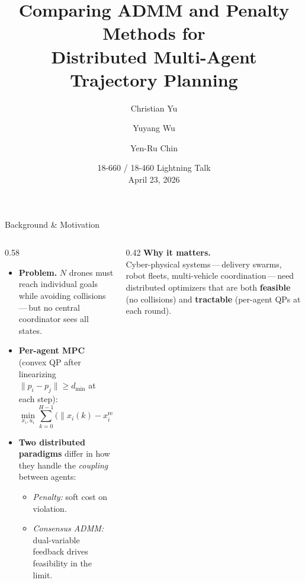 \documentclass[aspectratio=169,11pt]{beamer}
\title[ADMM vs.\ Penalty for Multi-Drone MPC]{%
  Comparing ADMM and Penalty Methods for\\
  Distributed Multi-Agent Trajectory Planning}
\author{Christian Yu \and Yuyang Wu \and Yen-Ru Chin}
\institute{Department of Electrical and Computer Engineering\\Carnegie Mellon University}
\date{18-660 / 18-460 Lightning Talk \\ April 23, 2026}
\newcommand{\dmin}{d_{\min}}
\newcommand{\good}[1]{\textcolor{green!45!black}{\textbf{#1}}}
\begin{document}
\begin{frame}
  \titlepage
\end{frame}

\begin{frame}{Background \& Motivation}
  \begin{columns}[T,onlytextwidth]
    \begin{column}{0.58\textwidth}
      \begin{itemize}
        \item \textbf{Problem.} $N$ drones must reach individual goals
              while avoiding collisions\,---\,but no central coordinator
              sees all states.
        \item \textbf{Per-agent MPC} (convex QP after linearizing
              $\|p_i - p_j\| \ge \dmin$ at each step):
              \[
                \min_{x_i,u_i}\!\!\sum_{k=0}^{H-1}\!
                \bigl(\|x_i(k)\!-\!x_i^{\text{ref}}(k)\|_Q^2
                     +\|u_i(k)\|_R^2\bigr)
              \]
        \item \textbf{Two distributed paradigms} differ in how they
              handle the \emph{coupling} between agents:
              \begin{itemize}
                \item \emph{Penalty:} soft cost on violation.
                \item \emph{Consensus ADMM:} dual-variable feedback
                      drives feasibility in the limit.
              \end{itemize}
      \end{itemize}
    \end{column}
    \begin{column}{0.42\textwidth}
      \small
      \textbf{Why it matters.}\\[0.3em]
      Cyber-physical systems\,---\,delivery swarms, robot fleets,
      multi-vehicle coordination\,---\,need distributed optimizers
      that are both
      \good{feasible} (no collisions) and
      \good{tractable} (per-agent QPs at each round).
    \end{column}
  \end{columns}
\end{frame}
\end{document}
